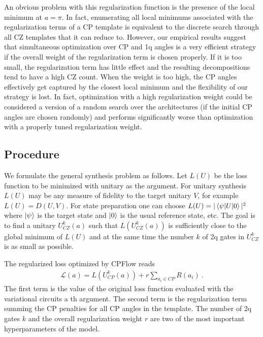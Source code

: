 \documentclass[draft, twocolumn, amsfonts, amssymb, aps, nofootinbib]{revtex4-2}
\newcommand{\CZ}{\textsf{CZ }}
\newcommand{\CP}{\textsf{CP }}
\begin{document}
An obvious problem with this regularization function is the presence of the local minimum at $a=\pi$. In fact, enumerating all local minimums associated with the regularization terms of a \CP template is equivalent to the discrete search through all \CZ templates that it can reduce to. However, our empirical results suggest that simultaneous optimization over \CP and 1q angles is a very efficient strategy if the overall weight of the regularization term is chosen properly. If it is too small, the regularization term has little effect and the resulting decompositions tend to have a high \CZ count. When the weight is too high, the \CP angles effectively get captured by the closest local minimum and the flexibility of our strategy is lost. In fact, optimization with a high regularization weight could be considered a version of a random search over the architectures (if the initial \CP angles are chosen randomly) and performs significantly worse than optimization with a properly tuned regularization weight.

\subsection{Procedure}

We formulate the general synthesis problem as follows. Let $L(U)$ be the loss function to be minimized with unitary as the argument. For unitary synthesis $L(U)$ may be any measure of fidelity to the target unitary $V$, for example $L(U)=D(U, V)$. For state preparation one can choose $L(U) = |\braket{\psi|U|0}|^2$ where $\ket{\psi}$ is the target state and $\ket{0}$ is the usual reference state, etc. The goal is to find a unitary $U^k_{CZ}(a)$ such that $L(U^k_{CZ}(a))$ is sufficiently close to the global minimum of $L(U)$ and at the same time the number $k$ of 2q gates in $U^k_{CZ}$ is as small as possible.

The regularized loss optimized by CPFlow reads
\begin{align}
\mathcal{L}(a)=L(U^k_{CP}(a))+r\sum_{a_i\in CP} R(a_i) \ . \label{CP loss}
\end{align}
The first term is the value of the original loss function evaluated with the variational circuits a th argument. The second term is the regularization term summing the \CP penalties for all \CP angles in the template. The number of 2q gates $k$ and the overall regularization weight $r$ are two of the most important hyperparameters of the model.
\end{document}
